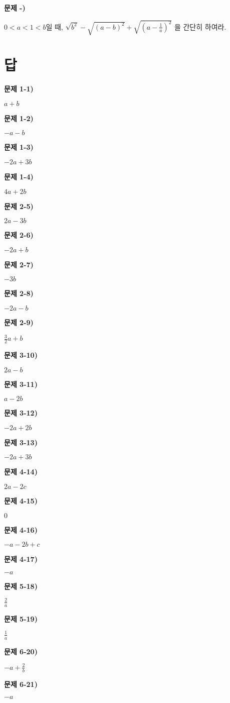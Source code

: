 \documentclass[a4paper]{oblivoir}
\newcounter{num}
\newcounter{type}
\newcommand\prob[1]
{\vs\par\noindent\stepcounter{num} \textbf{문제 \thetype-\thenum) #1}\par\noindent}
\newcommand\vs[1]{\vspace{30pt}}
\newcommand\an[1]{\bigskip\par\noindent\textbf{문제 #1)}\par\noindent}
\let\oldsection\section
\renewcommand\section{\clearpage\oldsection}
\begin{document}
%
\prob{}
\(0<a<1<b\)일 때,
\(\displaystyle
\sqrt{b^2}-\sqrt{(a-b)^2}+\sqrt{\left(a-\frac1a\right)^2}\)
을 간단히 하여라.


\section*{답}
\begin{minipage}{0.49\textwidth}
%
\an{1-1}
\(a+b\)

%
\an{1-2}
\(-a-b\)

%
\an{1-3}
\(-2a+3b\)

%
\an{1-4}
\(4a+2b\)

%
\an{2-5}
\(2a-3b\)

%
\an{2-6}
\(-2a+b\)

%
\an{2-7}
\(-3b\)

%
\an{2-8}
\(-2a-b\)

%
\an{2-9}
\(\frac32a+b\)

%
\an{3-10}
\(2a-b\)
\end{minipage}
\begin{minipage}{0.49\textwidth}

%
\an{3-11}
\(a-2b\)

%
\an{3-12}
\(-2a+2b\)

%
\an{3-13}
\(-2a+3b\)

%
\an{4-14}
\(2a-2c\)

%
\an{4-15}
\(0\)

%
\an{4-16}
\(-a-2b+c\)

%
\an{4-17}
\(-a\)

%
\an{5-18}
\(\frac2a\)

%
\an{5-19}
\(\frac1a\)

%
\an{6-20}
\(-a+\frac2b\)

%
\an{6-21}
\(-a\)

\end{minipage}
\end{document}
